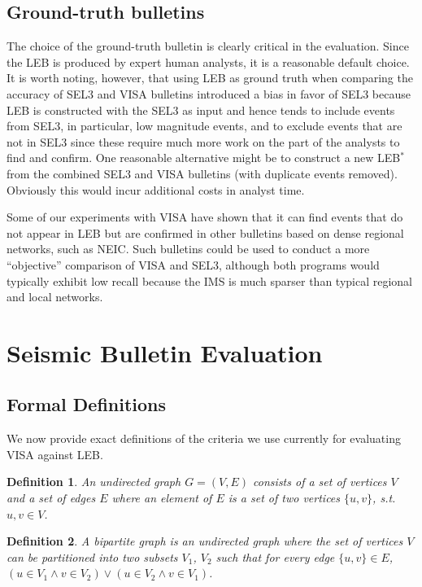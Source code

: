 \documentclass[a4paper,12pt]{article}
\newtheorem{defn}{Definition}
\begin{document}
\subsection{Ground-truth bulletins}

The choice of the ground-truth bulletin is clearly critical in the
evaluation. Since the LEB is produced by expert human analysts,
it is a reasonable default choice. It is worth noting, however, that
using LEB as ground truth when comparing the accuracy of SEL3 and VISA
bulletins introduced a bias in favor of SEL3 because LEB 
is constructed with the SEL3 as input and hence tends to
include events from SEL3, in particular, low magnitude events, and to
exclude events that are not in SEL3 since these require much more work
on the part of the analysts to find and confirm. One reasonable
alternative might be to construct a new LEB$^*$ from the
combined SEL3 and VISA bulletins (with duplicate events removed).
Obviously this would incur additional costs in analyst time.

Some of our experiments with VISA have shown that it can find events
that do not appear in LEB but are confirmed in other bulletins based
on dense regional networks, such as NEIC. Such bulletins could be used
to conduct a more ``objective'' comparison of VISA and SEL3, although
both programs would typically exhibit low recall because the IMS is
much sparser than typical regional and local networks.


\section{Seismic Bulletin Evaluation}

\subsection{Formal Definitions}

We now provide exact definitions of the criteria we use currently for
evaluating VISA against LEB.

\begin{defn}
An undirected graph $G=(V,E)$ consists of a set of vertices $V$ and a set
of edges $E$ where an element of $E$ is a set of two vertices $\{u,v\}$,
s.t. $u,v \in V$.
\end{defn}

\begin{defn}
A bipartite graph is an undirected graph where the set of vertices $V$
can be partitioned into two subsets $V_1$, $V_2$ such that for every edge
$\{u,v\} \in E$,  $(u \in V_1 \wedge v \in V_2) \vee ( u \in V_2 \wedge v \in
V_1)$.
\end{defn}
\end{document}
